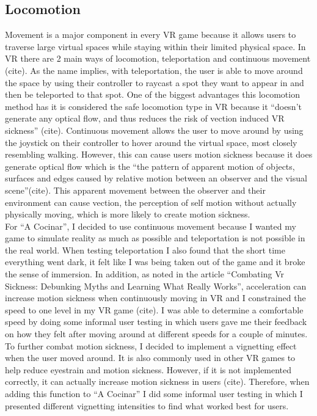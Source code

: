 \documentclass[10pt,twocolumn]{article}
\begin{document}
\subsection{Locomotion}
Movement is a major component in every VR game because it allows users to traverse large virtual spaces while staying within their limited physical space. In VR there are 2 main ways of locomotion, teleportation and continuous movement (cite). As the name implies, with teleportation, the user is able to move around the space by using their controller to raycast a spot they want to appear in and then be teleported to that spot. One of the biggest advantages this locomotion method has it is considered the safe locomotion type in VR because it “doesn’t generate any optical flow, and thus reduces the risk of vection induced VR sickness” (cite). Continuous movement allows the user to move around by using the joystick on their controller to hover around the virtual space, most closely resembling walking. However, this can cause users motion sickness because it does generate optical flow which is the “the pattern of apparent motion of objects, surfaces and edges caused by relative motion between an observer and the visual scene”(cite). This apparent movement between the observer and their environment can cause vection, the perception of self motion without actually physically moving, which is more likely to create motion sickness. 
\\
For “A Cocinar”, I decided to use continuous movement because I wanted my game to simulate reality as much as possible and teleportation is not possible in the real world. When testing teleportation I also found that the short time everything went dark, it felt like I was being taken out of the game and it broke the sense of immersion. In addition, as noted in the article “Combating Vr Sickness: Debunking Myths and Learning What Really Works”, acceleration can increase motion sickness when continuously moving in VR and I constrained the speed to one level in my VR game (cite). I was able to determine a comfortable speed by doing some informal user testing in which users gave me their feedback on how they felt after moving around at different speeds for a couple of minutes.  
 \\
To further combat motion sickness, I decided to implement a vignetting effect when the user moved around. It is also commonly used in other VR games to help reduce eyestrain and motion sickness. However, if it is not implemented correctly, it can actually increase motion sickness in users (cite). Therefore, when adding this function to “A Cocinar” I did some informal user testing in which I presented different vignetting intensities to find what worked best for users.
\end{document}
